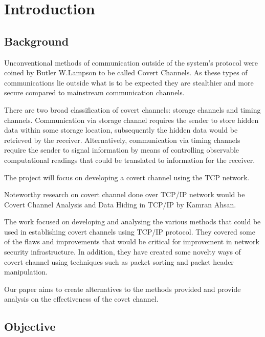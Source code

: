 \documentclass[letterpaper,twocolumn,10pt]{article}
\begin{document}
\section{Introduction}


\subsection{Background}

Unconventional methods of communication outside of the system’s protocol were coined by Butler W.Lampson to be called Covert Channels\cite{confinement}. As these types of communications lie outside what is to be expected they are stealthier and more secure compared to mainstream communication channels.

There are two broad classification of covert channels: storage channels and timing channels. Communication via storage channel requires the sender to store hidden data within some storage location, subsequently the hidden data would be retrieved by the receiver. Alternatively, communication via timing channels require the sender to signal information by means of controlling observable computational readings that could be translated to information for the receiver\cite{mdpi}.

The project will focus on developing a covert channel using the TCP network.

Noteworthy research on covert channel done over TCP/IP network would be Covert Channel Analysis and Data Hiding in TCP/IP by Kamran Ahsan\cite{kamran}. 

The work focused on developing and analysing the various methods that could be used in establishing covert channels using TCP/IP protocol. They covered some of the flaws and improvements that would be critical for improvement in network security infrastructure. In addition, they have created some novelty ways of covert channel using techniques such as packet sorting and packet header manipulation. 

Our paper aims to create alternatives to the methods provided and provide analysis on the effectiveness of the covet channel.  



\subsection{Objective}
\end{document}
